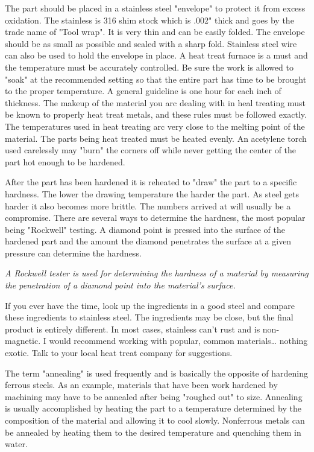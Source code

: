 
The part should be placed in a stainless steel "envelope" to protect it from
excess oxidation. The stainless is 316 shim stock which is .002" thick and goes
by the trade name of "Tool wrap". It is very thin and can be easily folded. The
envelope should be as small as possible and sealed with a sharp fold. Stainless
steel wire can also be used to hold the envelope in place. A heat treat furnace
is a must and the temperature must be accurately controlled. Be sure the work is
allowed to "soak" at the recommended setting so that the entire part has time to
be brought to the proper temperature. A general guideline is one hour for each
inch of thickness. The makeup of the material you arc dealing with in heal
treating must be known to properly heat treat metals, and these rules must be
followed exactly. The temperatures used in heat treating arc very close to the
melting point of the material. The parts being heat treated must be heated
evenly. An acetylene torch used carelessly may "burn" the corners off while
never getting the center of the part hot enough to be hardened.


After the part has been hardened it is reheated to "draw" the part to a specific
hardness. The lower the drawing temperature the harder the part. As steel gets
harder it also becomes more brittle. The numbers arrived at will usually be a
compromise. There are several ways to determine the hardness, the most popular
being "Rockwell" testing. A diamond point is pressed into the surface of the
hardened part and the amount the diamond penetrates the surface at a given
pressure can determine the hardness.

\bigskip
\textit{A Rockwell tester is used for determining the hardness of a material by
measuring the penetration of a diamond point into the material's surface.}
\bigskip

If you ever have the time, look up the ingredients in a good steel and compare
these ingredients to stainless steel. The ingredients may be close, but the
final product is entirely different. In most cases, stainless can't rust and is
non-magnetic. I would recommend working with popular, common materials\ldots
nothing exotic. Talk to your local heat treat company for suggestions.


The term "annealing" is used frequently and is basically the opposite of
hardening ferrous steels. As an example, materials that have been work hardened
by machining may have to be annealed after being "roughed out" to size.
Annealing is usually accomplished by heating the part to a temperature
determined by the composition of the material and allowing it to cool slowly.
Nonferrous metals can be annealed by heating them to the desired temperature and
quenching them in water.

